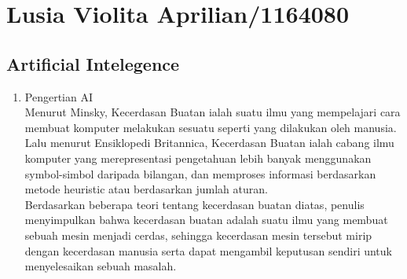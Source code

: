 \section{Lusia Violita Aprilian/1164080}
\subsection{Artificial Intelegence}
\begin{enumerate}
	\item Pengertian AI\\
	Menurut Minsky, Kecerdasan Buatan ialah suatu ilmu yang mempelajari cara membuat 			komputer melakukan sesuatu seperti yang dilakukan oleh manusia. Lalu menurut Ensiklopedi Britannica, Kecerdasan Buatan ialah cabang ilmu komputer yang merepresentasi pengetahuan lebih banyak menggunakan symbol-simbol daripada bilangan, dan memproses informasi berdasarkan metode heuristic atau berdasarkan jumlah aturan.\\
Berdasarkan beberapa teori tentang kecerdasan buatan diatas, penulis menyimpulkan bahwa kecerdasan buatan adalah suatu ilmu yang membuat sebuah mesin menjadi cerdas, sehingga kecerdasan mesin tersebut mirip dengan kecerdasan manusia serta dapat mengambil keputusan sendiri untuk menyelesaikan sebuah masalah.


\end{enumerate}
